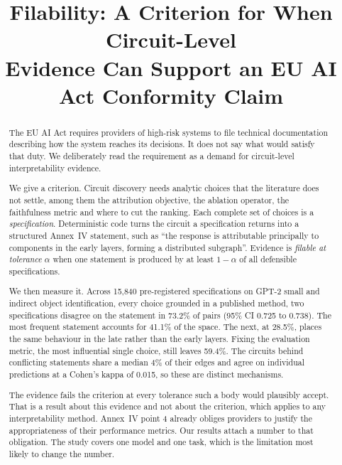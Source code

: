 \documentclass[letterpaper]{article} %
\title{Filability: A Criterion for When Circuit-Level\\Evidence Can Support an
EU AI Act Conformity Claim}
\author{}
\begin{document}
\maketitle

\begin{abstract}
\noindent
The EU AI Act requires providers of high-risk systems to file technical
documentation describing how the system reaches its decisions. It does not say
what would satisfy that duty. We deliberately read the requirement as a demand
for circuit-level interpretability evidence.

We give a criterion. Circuit discovery needs analytic choices that the
literature does not settle, among them the attribution objective, the ablation
operator, the faithfulness metric and where to cut the ranking. Each complete
set of choices is a \emph{specification}. Deterministic code turns the circuit a
specification returns into a structured Annex~IV statement, such as ``the
response is attributable principally to components in the early layers, forming
a distributed subgraph''. Evidence is \emph{filable at tolerance} $\alpha$ when
one statement is produced by at least $1 - \alpha$ of all defensible
specifications.

We then measure it. Across 15{,}840 pre-registered specifications on GPT-2 small
and indirect object identification, every choice grounded in a published
method, two specifications disagree on the statement in 73.2\% of pairs
(95\% CI 0.725 to 0.738). The most frequent statement accounts for 41.1\% of the
space. The next, at 28.5\%, places the same behaviour in the late rather than the
early layers. Fixing the evaluation metric, the most influential single choice,
still leaves 59.4\%. The circuits behind conflicting statements share a median
4\% of their edges and agree on individual predictions at a Cohen's kappa of
0.015, so these are distinct mechanisms.

The evidence fails the criterion at every tolerance such a body would plausibly
accept. That is a result about this evidence and not about the criterion, which
applies to any interpretability method. Annex~IV point 4 already obliges
providers to justify the appropriateness of their performance metrics. Our
results attach a number to that obligation. The study covers one model and one
task, which is the limitation most likely to change the number.
\end{abstract}
\end{document}
